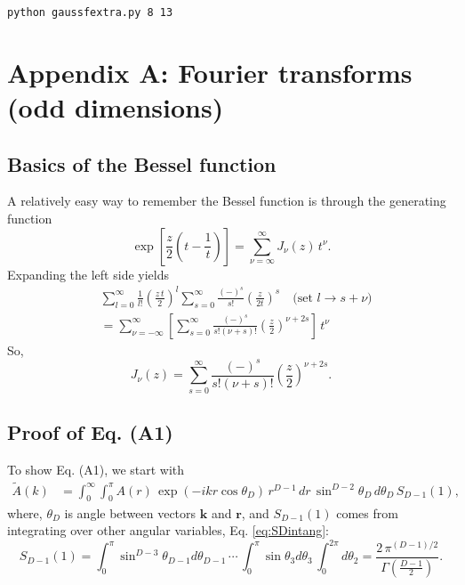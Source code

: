 \documentclass[preprint]{revtex4-1}
\numberwithin{equation}{subsection}
\numberwithin{table}{section}
\newcommand{\vct}[1]{\mathbf{#1}}
\providecommand{\vr}{} %
\renewcommand{\vr}{\vct{r}}
\newcommand{\vk}{\vct{k}}
\begin{document}
\qquad\texttt{python gaussfextra.py 8 13}



\section{Appendix A: Fourier transforms (odd dimensions)}



\subsection{Basics of the Bessel function}



A relatively easy way to remember the Bessel function
is through the generating function
\[
  \exp\left[ \frac{z}{2} \left(t - \frac{1}{t}\right) \right]
  =
  \sum_{\nu = \infty}^\infty J_\nu(z) \, t^\nu.
\]
%
Expanding the left side yields
\begin{align*}
&
  \sum_{l = 0}^\infty \frac{ 1 } { l! } \left( \frac {z \, t} 2\right)^l
  \sum_{s = 0}^\infty \frac{ (-)^s } { s! }
    \left( \frac z {2t} \right)^s
  \quad \mbox{(set $l \rightarrow s + \nu$)} \\
&=
  \sum_{\nu = -\infty}^\infty
  \left[
  \sum_{s = 0}^\infty
  \frac { (-)^s } {s! (\nu + s)! }
  \left( \frac z 2 \right)^{\nu + 2s}
  \right]
  \, t^\nu
\end{align*}
So,
\begin{equation}
  J_\nu(z)
=
  \sum_{s = 0}^\infty
  \frac{ (-)^s } { s! (\nu + s)! }
  \left( \frac z 2 \right)^{\nu + 2s}.
  \label{eq:bessel}
\end{equation}



\subsection{Proof of Eq. (A1)}



To show Eq. (A1), we start with
%
\begin{align}
  \tilde A(k)
&=
  \int_0^\infty
  \int_0^\pi
  A(r) \, \exp(-ikr \cos \theta_D) \,
    r^{D-1} \, dr \,
    \sin^{D-2} \theta_D \,
    d\theta_D \, S_{D-1}(1),
\label{eq:Aksphr}
\end{align}
%
where,
$\theta_D$ is angle between vectors $\vk$ and $\vr$,
and
$S_{D-1}(1)$ comes from integrating over other angular variables,
Eq. \eqref{eq:SDintang}:
\[
  S_{D-1}(1)
=
\int_0^\pi \sin^{D-3} \theta_{D-1} d\theta_{D-1} \,
\cdots \,
\int_0^\pi \sin \theta_3 d\theta_3 \,
\int_0^{2\pi} d\theta_2
=
\frac{2 \, \pi^{(D-1)/2} } { \Gamma\left( \frac{D-1} 2 \right) }.
\]
%
\end{document}

